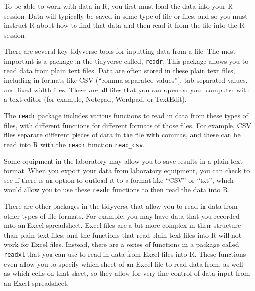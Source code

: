\documentclass[]{tufte-book}
\begin{document}
To be able to work with data in R, you first must load the data into your R
session. Data will typically be saved in some type of file or files, and
so you must instruct R about how to find that data and then read it from
the file into the R session.

There are several key tidyverse tools for inputting data from a file. The
most important is a package in the tidyverse called, \texttt{readr}. This package
allows you to read data from plain text files. Data are often stored in
these plain text files, including in formats like CSV (``comma-separated
values''), tab-separated values, and fixed width files. These are all files
that you can open on your computer with a text editor (for example,
Notepad, Wordpad, or TextEdit).

The \texttt{readr} package includes various functions to read in data from these
types of files, with different functions for different formats of those
files. For example, CSV files separate different pieces of data in the
file with commas, and these can be read into R with the \texttt{readr} function
\texttt{read\_csv}.

Some equipment in the laboratory may allow you to save results in a plain
text format. When you export your data from laboratory equipment, you can
check to see if there is an option to outload it to a format like ``CSV''
or ``txt'', which would allow you to use these \texttt{readr} functions to then
read the data into R.

There are other packages in the tidyverse that allow you to read in data
from other types of file formats. For example, you may have data that
you recorded into an Excel spreadsheet. Excel files are a bit more complex
in their structure than plain text files, and the functions that read
plain text files into R will not work for Excel files. Instead, there are
a series of functions in a package called \texttt{readxl} that you can use to
read in data from Excel files into R. These functions even allow you to
specify which sheet of an Excel file to read data from, as well as which
cells on that sheet, so they allow for very fine control of data input
from an Excel spreadsheet.
\end{document}
